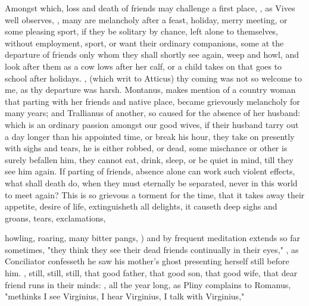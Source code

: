 Amongst which, loss and death of friends may challenge a first place, , as Vives well observes, , many are melancholy after a feast, holiday, merry
meeting, or some pleasing sport, if they be solitary by chance, left alone to
themselves, without employment, sport, or want their ordinary companions, some
at the departure of friends only whom they shall shortly see again, weep and
howl, and look after them as a cow lows after her calf, or a child takes on
that goes to school after holidays. , (which \Tully{} writ to Atticus) thy
coming was not so welcome to me, as thy departure was harsh. Montanus,
 makes mention of a country woman that
parting with her friends and native place, became grievously melancholy for
many years; and Trallianus of another, so caused for the absence of her
husband: which is an ordinary passion amongst our good wives, if their husband
tarry out a day longer than his appointed time, or break his hour, they take on
presently with sighs and tears, he is either robbed, or dead, some mischance or
other is surely befallen him, they cannot eat, drink, sleep, or be quiet in
mind, till they see him again. If parting of friends, absence alone can work
such violent effects, what shall death do, when they must eternally be
separated, never in this world to meet again? This is so grievous a torment for
the time, that it takes away their appetite, desire of life, extinguisheth all
delights, it causeth deep sighs and groans, tears, exclamations,

howling, roaring, many bitter pangs, ) and by frequent meditation
extends so far sometimes, "they think they see their dead
friends continually in their eyes," , as Conciliator
confesseth he saw his mother's ghost presenting herself still before him.
, still, still, still, that
good father, that good son, that good wife, that dear friend runs in their
minds: , all the year long, as
Pliny complains to Romanus, "methinks I see Virginius, I
hear Virginius, I talk with Virginius," \etc{}

